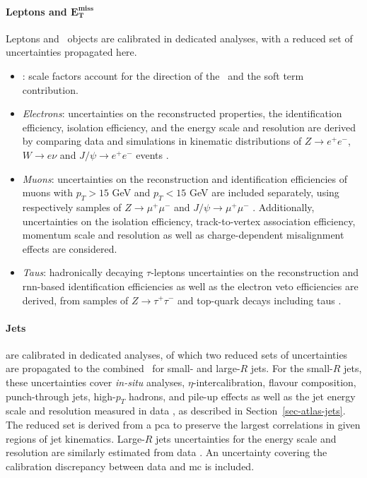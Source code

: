 \paragraph{Leptons and $\boldsymbol{E_T^{\text{miss}}}$} Leptons and \etm\ objects are calibrated in dedicated analyses, with a reduced set of uncertainties propagated here.
\begin{itemize}[leftmargin=*]
    \item \textit{\etm}: scale factors account for the direction of the \etm\ and the soft term contribution. 
    \item \textit{Electrons}: uncertainties on the reconstructed properties, the identification efficiency, isolation efficiency, and the energy scale and resolution are derived by comparing data and simulations in kinematic distributions of $Z \rightarrow e^+ e^-$, $W\rightarrow e\nu$ and $J/\psi \rightarrow e^+e^-$ events \Cite{Aaboud:2657964}. 
    \item \textit{Muons}: uncertainties on the reconstruction and identification efficiencies of muons with $p_T > 15$ GeV and $p_T < 15$ GeV are included separately, using respectively samples of $Z\rightarrow \mu^+\mu^-$ and $J/\psi \rightarrow \mu^+\mu^-$ \cite{Aad:2746302}. Additionally, uncertainties on the isolation efficiency, track-to-vertex association efficiency, momentum scale and resolution as well as charge-dependent misalignment effects are considered. 
    \item \textit{Taus}: hadronically decaying $\tau$-leptons uncertainties on the reconstruction and \gls{rnn}-based identification efficiencies as well as the electron veto efficiencies are derived, from samples of $Z\rightarrow\tau^+ \tau^-$ and top-quark decays including taus \cite{ATL-PHYS-PUB-2019-033, ATL-PHYS-PUB-2015-045, ATLAS-CONF-2017-029}.
\end{itemize}

{
\vspace{-1cm}
}
\clearpage

\paragraph{Jets} are calibrated in dedicated analyses, of which two reduced sets of uncertainties are propagated to the combined \vhbc\ for small- and large-$R$ jets. For the small-$R$ jets, these uncertainties cover \textit{in-situ} analyses, $\eta$-intercalibration, flavour composition, punch-through jets, high-$p_T$ hadrons, and pile-up effects as well as the jet energy scale and resolution measured in data \cite{ATLASjesjerMeas, Aad:2854733}, as described in Section~\ref{sec-atlas-jets}. The reduced set is derived from a \gls{pca} to preserve the largest correlations in given regions of jet kinematics. Large-$R$ jets uncertainties for the energy scale and resolution are similarly estimated from data \cite{ATLAS:2018bip}. An uncertainty covering the calibration discrepancy between data and \gls{mc} is included.

